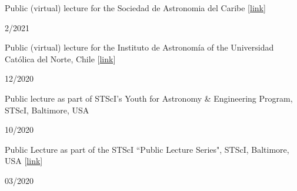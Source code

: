 \documentclass[12pt, a4paper]{article} %
\begin{document}
\vspace{0.2cm}

\begin{minipage}[t]{0.7\textwidth}
\begin{flushleft}%
  \setlength{\leftskip}{0.2cm}%
Public (virtual) lecture for the Sociedad de Astronomia del Caribe [\href{https://www.facebook.com/sociedad.astronomia/videos/179268820227106}{link}]
\end{flushleft}
\end{minipage}
\begin{minipage}[t]{0.3\textwidth}
\hfill 2/2021
\end{minipage}

\vspace{0.2cm}

\begin{minipage}[t]{0.7\textwidth}
\begin{flushleft}%
  \setlength{\leftskip}{0.2cm}%
Public (virtual) lecture for the Instituto de Astronom\'ia of the Universidad Cat\'olica del Norte, Chile [\href{https://fb.watch/2xSnifLOxN/}{link}]
\end{flushleft}
\end{minipage}
\begin{minipage}[t]{0.3\textwidth}
\hfill 12/2020
\end{minipage}

\vspace{0.2cm}

\begin{minipage}[t]{0.7\textwidth}
\begin{flushleft}%
  \setlength{\leftskip}{0.2cm}%
Public lecture as part of STScI’s Youth for Astronomy \& Engineering Program, STScI, Baltimore, USA
\end{flushleft}
\end{minipage}
\begin{minipage}[t]{0.3\textwidth}
\hfill 10/2020
\end{minipage}

\vspace{0.2cm}

\begin{minipage}[t]{0.7\textwidth}
\begin{flushleft}%
  \setlength{\leftskip}{0.2cm}%
Public Lecture as part of the STScI ``Public Lecture Series", STScI, Baltimore, USA [\href{https://www.youtube.com/watch?v=hnAwLra9Kh8&t=1247s}{link}]
\end{flushleft}
\end{minipage}
\begin{minipage}[t]{0.3\textwidth}
\hfill 03/2020
\end{minipage}
\end{document}
